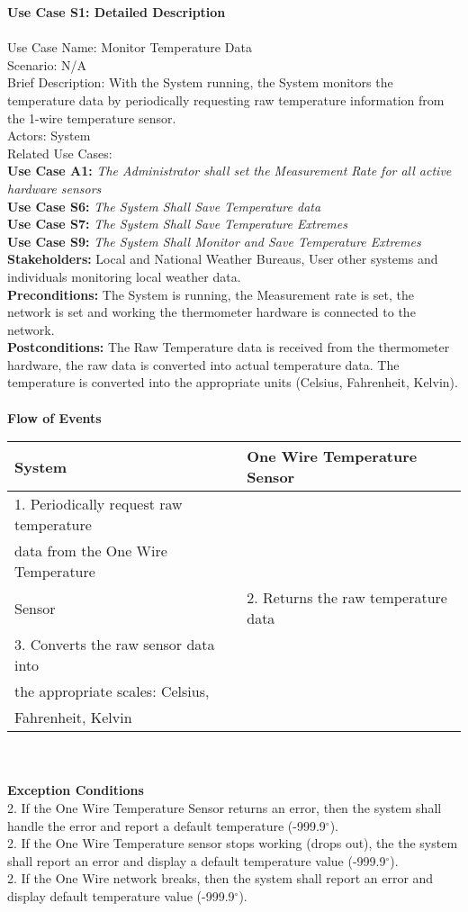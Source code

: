 \documentclass[letterpaper]{article}
\begin{document}
\noindent
\textbf{Use Case S1:  Detailed Description}\\\\
Use Case Name:  Monitor Temperature Data\\
Scenario: N/A\\
Brief Description:  With the System running, the System monitors the
temperature data by periodically requesting raw temperature
information from the 1-wire temperature sensor.\\
Actors:  System\\
Related Use Cases:\\
\textbf{Use Case A1:} \emph{The Administrator shall set the
Measurement Rate for all active hardware sensors}\\
\textbf{Use Case S6: }\emph{The System Shall Save Temperature
data}\\
\textbf{Use Case S7: }\emph{The System Shall Save Temperature
Extremes}\\
\textbf{Use Case S9: }\emph{The System Shall Monitor and Save
Temperature Extremes}\\
\textbf{Stakeholders:  } Local and National Weather Bureaus, User
other systems and individuals monitoring local weather data.\\
\textbf{Preconditions:  } The System is running, the Measurement
rate is set, the network is set and working the thermometer hardware
is connected to the network.\\
\textbf{Postconditions:  } The Raw Temperature data is received from
the thermometer hardware, the raw data is converted into actual
temperature data.  The temperature is converted into the appropriate
units (Celsius, Fahrenheit, Kelvin).\\\\
\textbf{Flow of Events}\\
\begin{tabular}{|l|l|}\hline
\textbf{System} & \textbf{One Wire Temperature Sensor}\\\hline
1. Periodically request raw temperature \\
data from the One Wire Temperature \\ 
Sensor &
2. Returns the raw temperature data\\\hline
3. Converts the raw sensor data into\\the appropriate scales:
Celsius, \\Fahrenheit, Kelvin
 \\\hline
\end{tabular}\\\\
\textbf{Exception Conditions}\\
2.  If the One Wire Temperature Sensor returns an error, then
the system shall handle the error and report a default
temperature (-999.9$^\circ$).\\
2.  If the One Wire Temperature sensor stops working (drops out),
the the system shall report an error and display a default
temperature value (-999.9$^\circ$).\\
2.  If the One Wire network breaks, then the system shall report an
error and display default temperature value (-999.9$^\circ$).
\end{document}
